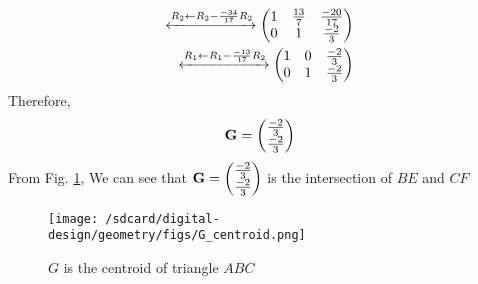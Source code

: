 \documentclass[11pt]{book}
\begin{document}
\begin{enumerate}[label=\thesection.\arabic*.,ref=\thesection.\theenumi]
\begin{align}
     \xleftrightarrow[]{R_2\leftarrow R_2-\frac{-34}{17}R_2}
    \begin{pmatrix}
    1 & \frac{13}{7} & \frac{-20}{17}
    \\
    0 & 1 & \frac{-2}{3}
    \end{pmatrix}
    \\
     \xleftrightarrow[]{R_1\leftarrow R_1-\frac{-13}{17}R_2}
     \begin{pmatrix}
    1 & 0 & \frac{-2}{3}
    \\
    0 & 1 & \frac{-2}{3}
    \end{pmatrix}
\end{align} 
Therefore, 
\begin{align}
\mathbf{G} = \begin{pmatrix}\frac{-2}{3} \\ \frac{-2}{3}\end{pmatrix}
\end{align}
From Fig. \ref{fig:Triangle101}, We can see that $\mathbf{G}=\begin{pmatrix}\frac{-2}{3}\\ \frac{-2}{3}\end{pmatrix}$ is the intersection of $BE$ and $CF$
\begin{figure}[h]
\centering
\texttt{[image: /sdcard/digital-design/geometry/figs/G\_centroid.png]}
\caption{$G$ is the centroid of triangle $ABC$}
\label{fig:Triangle101}
\end{figure}




\end{enumerate}
\end{document}
